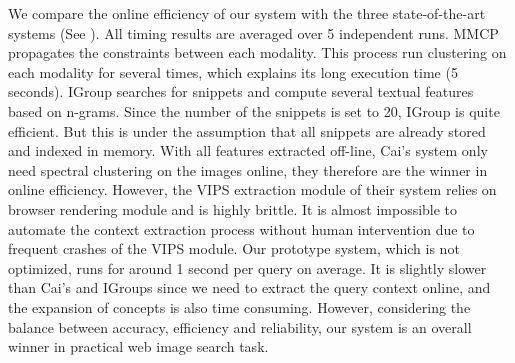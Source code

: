 We compare the online efficiency of our system with the three state-of-the-art systems
(See ).
All timing results are averaged over 5 independent runs.
MMCP propagates the constraints between each modality. This process run clustering
on each modality for several times, which explains its long execution time (5 seconds).
IGroup searches for snippets and compute several textual features based on
n-grams. Since the number of the snippets is set to 20, 
IGroup is quite efficient. But this is under the assumption that
all snippets are already stored and indexed in memory.
With all features extracted off-line, Cai's system
only need spectral clustering on the images online, 
they therefore are the winner in online efficiency. 
However, the VIPS extraction module of their system relies on
browser rendering module and is highly brittle. It is almost impossible to
automate the context extraction process without human intervention due to
frequent crashes of the VIPS module.
Our prototype system, which is not optimized, 
runs for around 1 second per query on average.
It is slightly slower than Cai's and IGroups
since we need to extract the query context online,
and the expansion of concepts is also time consuming.
However, considering the balance between accuracy, efficiency and reliability,
our system is an overall winner in practical web image search task.

